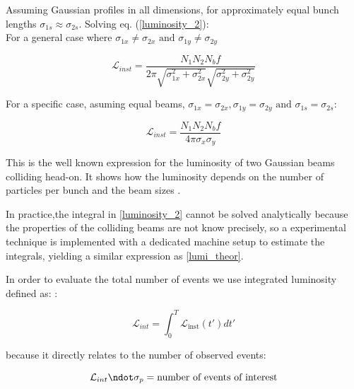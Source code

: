 
Assuming Gaussian profiles in all dimensions, for approximately equal bunch lengths $\sigma_{1s}\approx \sigma_{2s}$. Solving  eq. (\ref{luminosity_2}):\\

For a general case where $\sigma_{1x}\neq \sigma_{2x} \text{ and } \sigma_{1y}\neq \sigma_{2y}$

\begin{equation}
  \mathcal{L}_{inst}= \frac{N_{1} N_{2} N_{b}f }{2\pi \sqrt{\sigma_{1x}^{2}+\sigma_{2x}^{2}}\sqrt{\sigma_{2y}^{2}+\sigma_{2y}^{2}}}
  \label{lumi_general}
\end{equation}

For a specific case, asuming equal beams, $\sigma_{1x}= \sigma_{2x} ,\sigma_{1y}= \sigma_{2y} \text{ and } \sigma_{1s}= \sigma_{2s}$:

\begin{equation}
  \mathcal{L}_{inst}= \frac{N_{1} N_{2} N_{b}f }{4\pi \sigma_{x} \sigma_{y}}
  \label{lumi_theor}
\end{equation}

This is the well known expression for the luminosity of two Gaussian beams colliding head-on. It shows how the luminosity depends on the number of particles per bunch and the beam sizes \cite{concept_of_luminosity}.

In practice,the integral in  \ref{luminosity_2} cannot be solved analytically because   the properties of the colliding beams are not know precisely, so a experimental technique is implemented with a dedicated machine setup to estimate the integrals, yielding a similar expression as \ref{lumi_theor}.

In order to evaluate the total number of events we use integrated luminosity defined as: \cite{concept_of_luminosity}:

\begin{equation}
  \mathcal{L}_{int}=\int_{0}^{T} \mathcal {L}_{\text{inst}}(t') dt'
\end{equation}

because it directly relates to the number of observed events:

\begin{equation}
  \mathcal{L}_{int} \ndot \sigma_{p}= \text{number of events of interest}
\end{equation}


